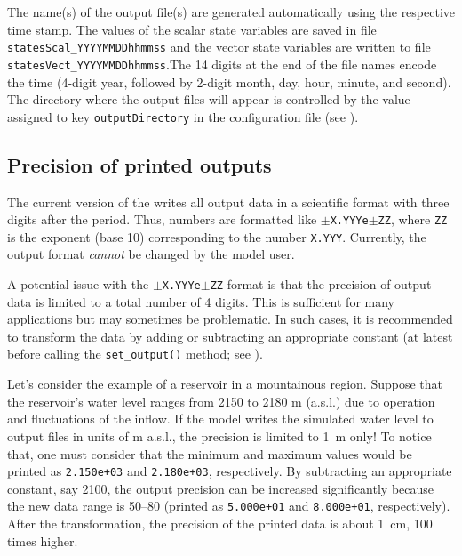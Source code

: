 The name(s) of the output file(s) are generated automatically using the respective time stamp. The values of the scalar state variables are saved in file \verb!statesScal_YYYYMMDDhhmmss! and the vector state variables are written to file \verb!statesVect_YYYYMMDDhhmmss!.The 14 digits at the end of the file names encode the time (4-digit year, followed by 2-digit month, day, hour, minute, and second). The directory where the output files will appear is controlled by the value assigned to key \verb!outputDirectory! in the configuration file (see ).

\subsection{Precision of printed outputs}  \label{sec:input-outputPrecision} 

The current version of the  writes all output data in a scientific format with three digits after the period. Thus, numbers are formatted like \texttt{$\pm$X.YYYe$\pm$ZZ}, where \texttt{ZZ} is the exponent (base 10) corresponding to the number \texttt{X.YYY}. Currently, the output format \emph{cannot} be changed by the model user.

A potential issue with the \texttt{$\pm$X.YYYe$\pm$ZZ} format is that the precision of output data is limited to a total number of 4 digits. This is sufficient for many applications but may sometimes be problematic. In such cases, it is recommended to transform the data by adding or subtracting an appropriate constant (at latest before calling the \verb!set_output()! method; see ).

Let's consider the example of a reservoir in a mountainous region. Suppose that the reservoir's water level ranges from 2150 to 2180 m (a.s.l.) due to operation and fluctuations of the inflow. If the model writes the simulated water level to output files in units of m a.s.l., the precision is limited to 1~m only! To notice that, one must consider that the minimum and maximum values would be printed as \texttt{2.150e+03} and \texttt{2.180e+03}, respectively. By subtracting an appropriate constant, say 2100, the output precision can be increased significantly because the new data range is 50--80 (printed as \texttt{5.000e+01} and \texttt{8.000e+01}, respectively). After the transformation, the precision of the printed data is about 1~cm, \ie{} 100 times higher.
